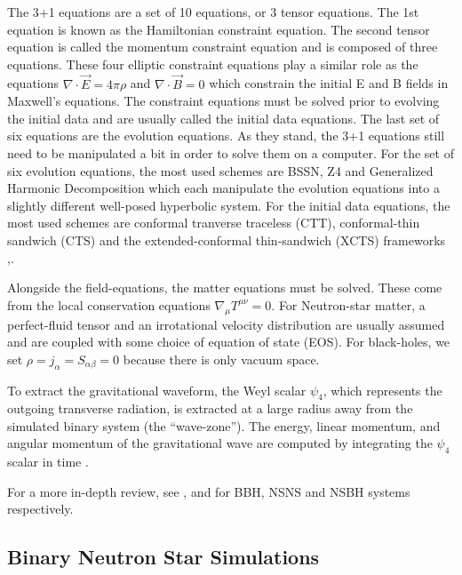 \documentclass{ut-thesis}
\begin{document}
The 3+1 equations are a set of 10 equations, or 3 tensor equations. The 1st equation is known as the Hamiltonian constraint equation. The second tensor equation is called the momentum constraint equation and is composed of three equations. These four elliptic constraint equations play a similar role as the equations $\nabla \cdot \vec E = 4\pi\rho$ and $\nabla \cdot \vec B = 0$ which constrain the initial E and B fields in Maxwell's equations. The constraint equations must be solved prior to evolving the initial data and are usually called the initial data equations. The last set of six equations are the evolution equations. As they stand, the 3+1 equations still need to be manipulated a bit in order to solve them on a computer. For the set of six evolution equations, the most used schemes are BSSN, Z4 and Generalized Harmonic Decomposition which each manipulate the evolution equations into a slightly different well-posed hyperbolic system. For the initial data equations, the most used schemes are conformal tranverse traceless (CTT), conformal-thin sandwich (CTS) and the extended-conformal thin-sandwich (XCTS) frameworks \cite{alcubierre2012introduction},\cite{sopuerta2015gravitational}.

Alongside the field-equations, the matter equations must be solved. These come from the local conservation equations $\nabla_{\mu}T^{\mu\nu} = 0$. For Neutron-star matter, a perfect-fluid tensor and an irrotational velocity distribution are usually assumed and are coupled with some choice of equation of state (EOS). For black-holes, we set $\rho = j_{\alpha} = S_{\alpha\beta} = 0$ because there is only vacuum space.

To extract the gravitational waveform, the Weyl scalar $\psi_{4}$, which represents the outgoing transverse radiation, is extracted at a large radius away from the simulated binary system (the ``wave-zone''). The energy, linear momentum, and angular momentum of the gravitational wave are computed by integrating the $\psi_{4}$ scalar in time \cite{kyutoku2015dynamical}.

For a more in-depth review, see \cite{sperhake2014numerical}, \cite{faber2012binary} and \cite{shibata2011coalescence} for BBH, NSNS and NSBH systems respectively.

\subsection{Binary Neutron Star Simulations}
\end{document}
